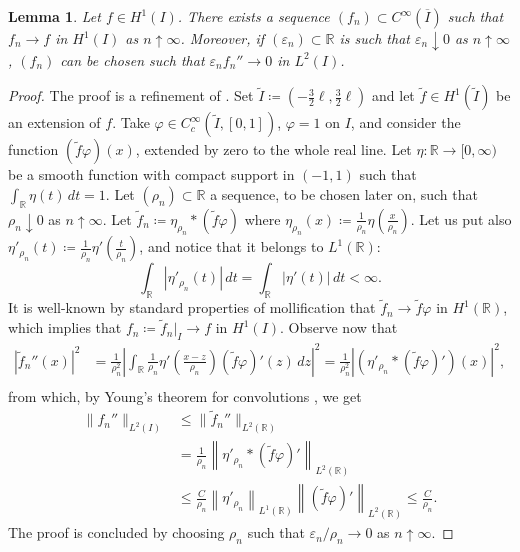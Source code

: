 \documentclass[a4, 11pt, reqno, final]{amsart}
\newcommand{\bbR}{\mathbb{R}}
\newcommand{\n}[1]{\left\|#1\right\|}  %
\newcommand\e{\varepsilon}
\theoremstyle{plain}%
\newtheorem{lemma}[theorem]{Lemma}
\newcommand{\QED}{\hspace{1ex}\hfill$\blacksquare$\vspace{2ex}}
\begin{document}
	\begin{lemma}\label{lemmader2}
		Let $f \in H^1(I)$. There exists a sequence $(f_n) \subset C^\infty(\overline{I})$ such that $f_n \to f$ in $H^1(I)$ as $n \uparrow \infty$. Moreover, if $(\e_n)\subset \bbR$ is such that $\e_n \downarrow 0$ as $n \uparrow \infty$,  $(f_n)$ can be chosen such that
		$\e_n f_n''\to 0$ in $L^2(I)$.
	\end{lemma}
	\begin{proof}
		The proof is a refinement of \cite[Lemma 11]{Paroni2024c}.
		Set $\widetilde I\coloneqq  (-\frac32\ell,\frac32\ell)$ and let $\widetilde{f} \in H^1(\widetilde{I})$ be an extension of $f$.
		Take $\varphi \in C_c^\infty(\widetilde I, [0,1])$, $\varphi=1$ on $I$, and consider the function $(\widetilde f\varphi)(x)$, extended by zero to the whole real line.
		Let $\eta:\bbR\to [0,\infty)$ be a smooth function with compact support in $(-1,1)$ such that $\int_\bbR \eta(t) \, dt = 1$. Let $(\rho_n)\subset\bbR$ a sequence, to be chosen later on, such that $\rho_n\downarrow 0$ as $n\uparrow \infty$. Let $\widetilde{f}_n\coloneqq  \eta_{\rho_n} \ast  (\widetilde{f} \varphi)$ where $\eta_{\rho_n}(x)\coloneqq  \frac{1}{\rho_n}\eta(\frac{x}{\rho_n})$.
		Let us put also $\eta'_{\rho_n}(t) \coloneqq  \frac{1}{\rho_n}\eta'(\frac{t}{\rho_n})$, and notice that it belongs to $L^1(\bbR)$:
		$$ \int_\bbR |\eta'_{\rho_n}(t)| \, dt = \int_\bbR |\eta'(t)| \, dt <\infty. $$
		It is well-known by standard properties of mollification that $\widetilde{f}_n \to \widetilde{f}\varphi$ in $H^1(\bbR)$, which implies that
		$f_n \coloneqq   \widetilde{f}_n|_I\to f$ in $H^1(I)$.
		Observe now that
		$$
		\begin{aligned}
			|\widetilde{f}_n''(x)|^2 &=\frac 1 {\rho_n^2} |\int_{\bbR} \frac{1}{\rho_n}\eta'(\frac{x-z}{\rho_n}) (\widetilde f\varphi)'(z)\,dz|^2 = \frac 1 {\rho_n^2} |(\eta'_{\rho_n}\ast(\widetilde f\varphi)')(x)|^2,\\
		\end{aligned}
		$$
		from which, by Young's theorem for convolutions \cite[Corollary 2.25]{Adams2003}, we get
		$$ \begin{aligned}
			\|f_n''\|_{L^2(I)}&\leq \|\widetilde{f}_n''\|_{L^2(\bbR)}\\
			&= \frac{1}{\rho_n}\n{\eta'_{\rho_n}\ast (\widetilde f\varphi)'}_{L^2(\bbR)}\\
			&\leq \frac{C}{\rho_n} \n{\eta'_{\rho_n}}_{L^1(\bbR)}\n{(\widetilde f\varphi)'}_{L^2(\bbR)}  \leq \frac{C}{\rho_n}.
		\end{aligned}$$
		The proof is concluded by choosing $\rho_n$ such that $\e_{n}/\rho_n \to 0$ as $n \uparrow \infty$.
	\end{proof}
\end{document}
